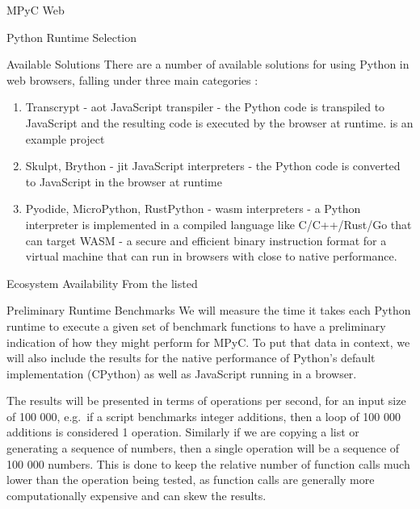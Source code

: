 \begin{block}{MPyC Web}
\begin{block}{Python Runtime Selection}
\begin{block}{Available Solutions}
\label{thesis__090-mpyc-web.md__available-solutions-1}
There are a number of available solutions for using Python in web browsers, falling under three main categories\autocite{pyodideIntroMozilla} \autocite{anvilPythonBrowser}:

\begin{enumerate}
\tightlist
\item
  Transcrypt\autocite{transcryptRepo} - \gls{aot} JavaScript transpiler - the Python code is transpiled to JavaScript and the resulting code is executed by the browser at runtime. is an example project
\item
  Skulpt\autocite{skulptDocs}, Brython\autocite{brythonDocs} - \gls{jit} JavaScript interpreters - the Python code is converted to JavaScript in the browser at runtime
\item
  Pyodide\autocite{pyodideDocs}, MicroPython\autocite{microPythonDocs}, RustPython\autocite{rustPythonDocs} - \gls{wasm}\autocite{wasmDocs} interpreters - a Python interpreter is implemented in a compiled language like C/C++/Rust/Go that can target WASM - a secure and efficient binary instruction format for a virtual machine that can run in browsers with close to native performance.
\end{enumerate}
\end{block}

\begin{block}{Ecosystem Availability}
\label{thesis__090-mpyc-web.md__ecosystem-availability-1}
From the listed
\end{block}

\begin{block}{Preliminary Runtime Benchmarks}
\label{thesis__090-mpyc-web.md__preliminary-runtime-benchmarks-1}
We will measure the time it takes each Python runtime to execute a given set of benchmark functions to have a preliminary indication of how they might perform for MPyC. To put that data in context, we will also include the results for the native performance of Python's default implementation (CPython) as well as JavaScript running in a browser.

The results will be presented in terms of operations per second, for an input size of 100 000, e.g.~if a script benchmarks integer additions, then a loop of 100 000 additions is considered 1 operation. Similarly if we are copying a list or generating a sequence of numbers, then a single operation will be a sequence of 100 000 numbers. This is done to keep the relative number of function calls much lower than the operation being tested, as function calls are generally more computationally expensive and can skew the results.


\end{block}
\end{block}
\end{block}
